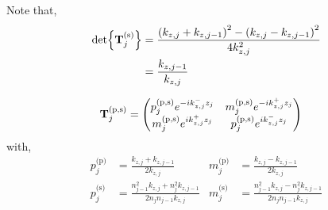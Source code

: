 Note that,
\begin{align*}
	\det{\vb{T}^{\text{(s)}}_j} & = \frac{\pqty{k_{z,j} + k_{z,j-1}}^2 - \pqty{k_{z,j} - k_{z,j-1}}^2}{4 k_{z,j}^2} \\
	                            & = \frac{ k_{z,j-1}}{ k_{z,j}}
\end{align*}

\begin{align*}
	\vb{T}^{\text{(p,s)}}_j                   & =
	\pmqty{
	p^{\text{(p,s)}}_{j} e^{-ik_{z,j}^{-}z_j} &
	m^{\text{(p,s)}}_{j} e^{-ik_{z,j}^{+}z_j}     \\
	m^{\text{(p,s)}}_{j} e^{ik_{z,j}^{+}z_j}  &
	p^{\text{(p,s)}}_{j} e^{ik_{z,j}^{-}z_j}
	}
\end{align*} with,
\begin{align*}
	p^{\text{(p)}}_{j} & = \frac{k_{z,j} + k_{z,j-1}}{2 k_{z,j}}
	                   & m^{\text{(p)}}_{j}                                                  & = \frac{k_{z,j} - k_{z,j-1}}{2 k_{z,j}}                             \\
	p^{\text{(s)}}_{j} & = \frac{n_{j-1}^2k_{z,j} + n_{j}^2k_{z,j-1}}{2 n_{j}n_{j-1}k_{z,j}}
	                   & m^{\text{(s)}}_{j}                                                  & = \frac{n_{j-1}^2k_{z,j} - n_{j}^2k_{z,j-1}}{2 n_{j}n_{j-1}k_{z,j}}
\end{align*}

